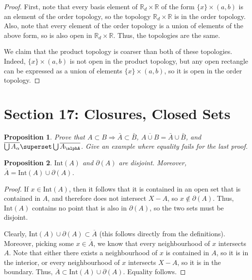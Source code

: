 \documentclass[10pt, oneside]{amsart}
\newtheorem{prop}{Proposition}
\begin{document}
    \begin{proof}
      First, note that every basis element of $\mathbb{R}_{d} \times \mathbb{R}$ of the form $\{x\} \times (a, b)$ is an element of the order topology, so the topology $\mathbb{R}_d \times \mathbb{R}$ is in the order topology.
      Also, note that every element of the order topology is a union of elements of the above form, so is also open in $\mathbb{R}_d \times \mathbb{R}$. Thus, the topologies are the same.
      \newline

      We claim that the product topology is coarser than both of these topologies. Indeed, $\{x\} \times (a, b)$ is not open in the product topology, but any open rectangle can be expressed as a union of elements $\{x\} \times (a, b)$, so
      it is open in the order topology.
      \end{proof}

    \section{Section 17: Closures, Closed Sets}

    \begin{prop}
      Prove that $A \subset B \Rightarrow \bar{A} \subset \bar{B}$, $\overline{A \cup B} = \bar{A} \cup \bar{B}$, and $\overline{ \bigcup A_\alpha} \superset \bigcup \overline{A_\alphA}$. Give an example where equality fails for the
      last proof.
      \end{prop}


    \begin{prop}
      $\mathrm{Int}(A)$ and $\partial(A)$ are disjoint. Moreover, $\overline{A} = \mathrm{Int}(A) \cup \partial(A)$.
    \end{prop}

    \begin{proof}
      If $x \in \mathrm{Int}(A)$, then it follows that it is contained in an open set that is contained in $A$, and therefore does not intersect $X - A$, so $x \notin \partial(A)$. Thus, $\mathrm{Int}(A)$ contains no point that
      is also in $\partial(A)$, so the two sets must be disjoint.
      \newline

      Clearly, $\text{Int}(A) \cup \partial(A) \subset \overline{A}$ (this follows directly from the definitions). Moreover, picking some $x \in \overline{A}$,
      we know that every neighbourhood of $x$ intersects $A$. Note that
      either there exists a neighbourhood of $x$ is contained in $A$, so it is in the interior, or every neighbourhood of $x$ intersects $X - A$, so it is in the boundary. Thus, $\overline{A} \subset \text{Int}(A) \cup \partial(A)$. Equality follows.
    \end{proof}
\end{document}
